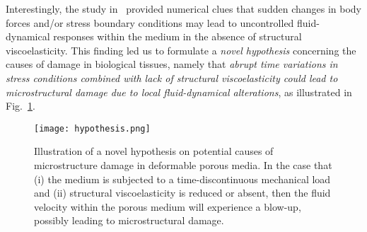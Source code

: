 \documentclass[12pt,a4paper]{amsart}
\theoremstyle{definition}
\begin{document}
Interestingly, the study in~\cite{ARMA} provided numerical clues that sudden changes in body forces and/or stress boundary conditions may lead to uncontrolled fluid-dynamical responses within the medium in the absence of structural viscoelasticity. This finding led us to formulate a \textit{novel hypothesis} concerning the causes of damage in biological tissues, namely
that \textit{abrupt time variations in stress conditions combined with lack of structural viscoelasticity could lead to microstructural damage due to local fluid-dynamical alterations}, as illustrated in Fig.~\ref{fig:hypothesis}.

\vspace{.2cm}

\begin{figure}[h!]
\begin{center}
 \texttt{[image: hypothesis.png]}
\end{center}
\caption{Illustration of a novel hypothesis on potential causes of microstructure damage in deformable porous media. In the case that (i) the medium is subjected to a time-discontinuous mechanical load and (ii) structural viscoelasticity is reduced or absent, then the fluid velocity within the porous medium will experience a blow-up, possibly leading to microstructural damage.}\label{fig:hypothesis}
\end{figure}
\end{document}

